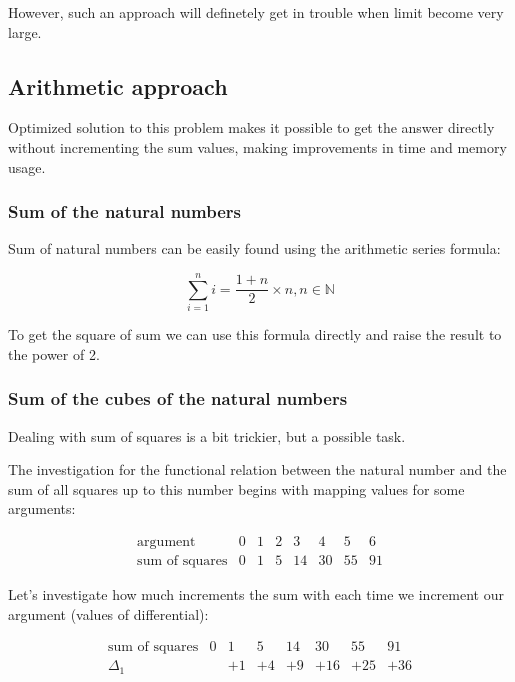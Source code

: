 \documentclass[14pt]{article}
\begin{document}
    However, such an approach will definetely get in trouble when limit become very large.

  \subsection{Arithmetic approach}
    
    Optimized solution to this problem makes it possible to get the answer directly without incrementing the sum values, making improvements in time and memory usage.

    \subsubsection{Sum of the natural numbers}

      Sum of natural numbers can be easily found using the arithmetic series formula:
      
      $$\sum_{i = 1}^{n} i = \frac{1 + n}{2} \times n, n \in \mathbb{N}$$
      
      To get the square of sum we can use this formula directly and raise the result to the power of 2.

    \subsubsection{Sum of the cubes of the natural numbers}

      Dealing with sum of squares is a bit trickier, but a possible task. 

      The investigation for the functional relation between the natural number and the sum of all squares up to this number begins with mapping values for some arguments:

      $$
      \begin{array}{l|rrrrrrr}
        \text{argument} & 0 & 1 & 2 & 3 & 4 & 5 & 6 \\
        \hline
        \text{sum of squares} & 0 & 1 & 5 & 14 & 30 & 55 & 91
      \end{array}
      $$

      Let's investigate how much increments the sum with each time we increment our argument (values of differential):
      
      $$
      \begin{array}{l|rrrrrrr}
        \text{sum of squares} & 0 & 1 & 5 & 14 & 30 & 55 & 91 \\
        \hline
        \varDelta_1 &  & +1 & +4 & +9 & +16 & +25 & +36 \\
      \end{array}
      $$
\end{document}
